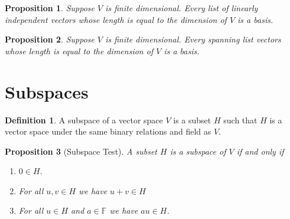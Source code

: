 \documentclass[12pt,letterpaper]{amsart}
\theoremstyle{plain}
\newtheorem{proposition}{Proposition}[section]
\theoremstyle{definition}
\newtheorem{definition}[theorem]{Definition}
\numberwithin{equation}{section}
\begin{document}
\begin{proposition} Suppose $V$ is finite dimensional. Every list of linearly independent vectors whose length is equal to the dimension of $V$ is a basis. 
\end{proposition}

\begin{proposition} Suppose $V$ is finite dimensional. Every spanning list vectors whose length is equal to the dimension of $V$ is a basis. 
\end{proposition}

\section{Subspaces}
\begin{definition} A subspace of a vector space $V$ is a subset $H$ such that $H$ is a vector space under the same binary relations and field as $V$. 
\end{definition}

\begin{proposition}[Subspace Test] A subset $H$ is a subspace of $V$ if and only if 
\begin{enumerate}[1.] 
\item $0\in H$. 
\item For all $u,v\in H$ we have $u+v\in H$
\item For all $u\in H$ and $a\in \mathbb{F}$ we have $au\in H$.
\end{enumerate}
\end{proposition}
\end{document}
